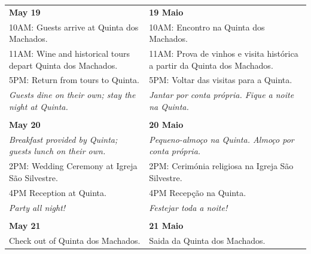 \documentclass[6pt]{article}
\begin{document}
\pagestyle{empty}

\small 
\begin{tabular}{p{2in}|p{2in}}
  \textbf{May 19} & \textbf{19 Maio} \\
  {10AM:} Guests arrive at Quinta dos Machados.
  &
  {10AM:} Encontro na Quinta dos Machados.\\
  {11AM:} Wine and historical tours depart Quinta dos Machados. 
  &
  {11AM:} Prova de vinhos e visita histórica a partir da Quinta dos Machados.\\
  {5PM:} Return from tours to Quinta.
  &
  {5PM:} Voltar das visitas para a Quinta.
  \\
  {\it Guests dine on their own; stay the night at Quinta.}
  &
  {\it Jantar por conta própria. Fique a noite na Quinta.}\\
  &\\
  {\bf May 20} & {\bf 20 Maio} \\
  {\it Breakfast provided by Quinta; guests lunch on their own.}
  &
  {\it Pequeno-almoço na Quinta. Almoço por conta própria.}
  \\
  {2PM:} Wedding Ceremony at Igreja São Silvestre.
  &
  {2PM}: Cerimónia religiosa na Igreja São Silvestre.
  \\
  {4PM} Reception at Quinta.
  &
  {4PM} Recepção na Quinta.
  \\
  {\it Party all night!}&{\it Festejar toda a noite!}
  \\
  &\\
  {\bf May 21} & {\bf 21 Maio} \\
  Check out of Quinta dos Machados. & Saida da Quinta dos Machados.\\
\end{tabular}
\end{document}
